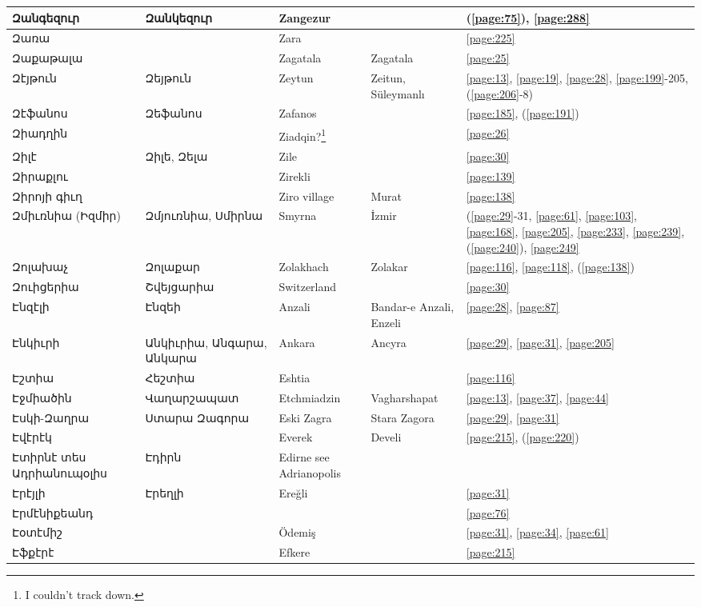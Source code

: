\begin{center}
\begin{longtable}{|p{}|p{3cm}|p{3cm}|p{2cm}|p{3cm}|}
Զանգեզուր& Զանկեզուր&Zangezur & &(\ref{page:75}), \ref{page:288}\\ \hline
Զառա& &Zara & &\ref{page:225}\\ \hline
Զաքաթալա& & Zagatala &Zagatala &\ref{page:25}\\ \hline
Զէյթուն&Զեյթուն &Zeytun &Zeitun, Süleymanlı &\ref{page:13}, \ref{page:19}, \ref{page:28}, \ref{page:199}-205, (\ref{page:206}-8)\\ \hline
Զէֆանոս& Զեֆանոս&Zafanos & &\ref{page:185}, (\ref{page:191})\\ \hline
Զիադղին& &Ziadqin?\footnote{I couldn't track down.} & &\ref{page:26}\\ \hline
Զիլէ& Զիլե,   Զելա & Zile& &\ref{page:30}\\ \hline
Զիրաքլու& &Zirekli & &\ref{page:139}\\ \hline
Զիրոյի գիւղ& &Ziro village &Murat &\ref{page:138}\\ \hline
Զմիւռնիա (Իզմիր)&Զմյուռնիա, Սմիրնա  &Smyrna    &İzmir &(\ref{page:29}-31, \ref{page:61}, \ref{page:103}, \ref{page:168}, \ref{page:205}, \ref{page:233}, \ref{page:239}, (\ref{page:240}), \ref{page:249}\\ \hline
Զոլախաչ& Զոլաքար&Zolakhach & Zolakar&\ref{page:116}, \ref{page:118}, (\ref{page:138})\\ \hline
Զուիցերիա& Շվեյցարիա&Switzerland & &\ref{page:30}\\ \hline
Էնզէլի&Էնզեի & Anzali& Bandar-e Anzali, Enzeli&\ref{page:28}, \ref{page:87}\\ \hline
Էնկիւրի&Անկիւրիա, Անգարա, Անկարա &   Ankara&Ancyra &\ref{page:29}, \ref{page:31}, \ref{page:205}\\ \hline
Էշտիա&   Հեշտիա & Eshtia& &\ref{page:116}\\ \hline
Էջմիածին&Վաղարշապատ &Etchmiadzin & Vagharshapat&\ref{page:13}, \ref{page:37}, \ref{page:44}\\ \hline
Էսկի-Զաղրա& Ստարա Զագորա& Eski Zagra&Stara Zagora &\ref{page:29}, \ref{page:31}\\ \hline
Էվէրէկ& &Everek &Develi &\ref{page:215}, (\ref{page:220})\\ \hline
Էտիրնէ տես Ադրիանուպօլիս&Էդիրն &Edirne see Adrianopolis & &\\ \hline
Էրէյլի&Էրեղլի & Ereğli& &\ref{page:31}\\ \hline
Էրմէնիքեանդ& & & &\ref{page:76}\\ \hline
Էօտէմիշ& & Ödemiş& &\ref{page:31}, \ref{page:34}, \ref{page:61}\\ \hline
Էֆքէրէ& &Efkere & &\ref{page:215}\\ \hline

\end{longtable}
\end{center}
